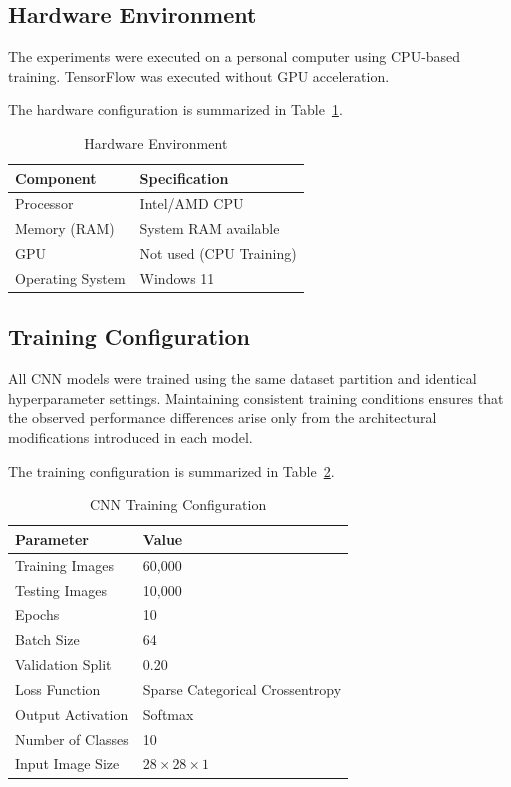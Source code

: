 \subsection{Hardware Environment}

The experiments were executed on a personal computer using CPU-based training. TensorFlow was executed without GPU acceleration.

The hardware configuration is summarized in Table~\ref{tab:hardware_environment}.

\begin{table}[H]
\centering
\caption{Hardware Environment}\label{tab:hardware_environment}

\begin{tabular}{ll}
\toprule
\textbf{Component} & \textbf{Specification} \\
\midrule
Processor & Intel/AMD CPU \\
Memory (RAM) & System RAM available \\
GPU & Not used (CPU Training) \\
Operating System & Windows 11 \\
\bottomrule
\end{tabular}

\end{table}

\subsection{Training Configuration}

All CNN models were trained using the same dataset partition and identical hyperparameter settings. Maintaining consistent training conditions ensures that the observed performance differences arise only from the architectural modifications introduced in each model.

The training configuration is summarized in Table~\ref{tab:training_configuration}.

\begin{table}[H]
\centering
\caption{CNN Training Configuration}\label{tab:training_configuration}

\begin{tabular}{ll}
\toprule
\textbf{Parameter} & \textbf{Value} \\
\midrule
Training Images & 60,000 \\
Testing Images & 10,000 \\
Epochs & 10 \\
Batch Size & 64 \\
Validation Split & 0.20 \\
Loss Function & Sparse Categorical Crossentropy \\
Output Activation & Softmax \\
Number of Classes & 10 \\
Input Image Size & $28 \times 28 \times 1$ \\
\bottomrule
\end{tabular}

\end{table}

